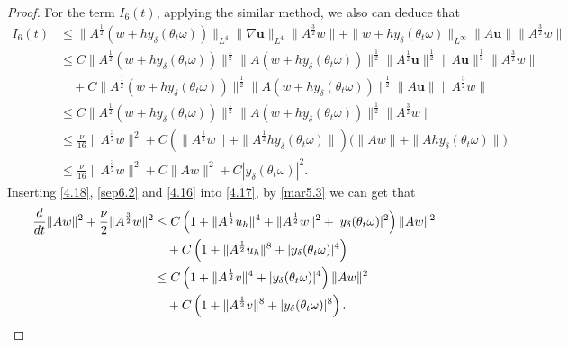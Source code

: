 \documentclass[10pt,a4paper]{amsart}
\renewcommand{\d}{{\rm{d}}}
\begin{document}
\begin{proof}
For the term $I_{6}(t)$, applying the similar method, we also can deduce that
\begin{align}\label{4.16}
I_{6}(t)&\leq\|A^{\frac12}(w+hy_\delta(\theta_t\omega))\|_{L^4}\|\nabla \textbf{u}\|_{L^4}\|A^\frac32w\|+\|w+hy_\delta(\theta_t\omega)\|_{L^\infty}\|A\textbf{u}\|\|A^\frac32w\|\nonumber\\
&\leq C\|A^{\frac12}(w+hy_\delta(\theta_t\omega))\|^\frac12\|A(w+hy_\delta(\theta_t\omega))\|^\frac12\|A^\frac12\textbf{u}\|^\frac12
\|A\textbf{u}\|^\frac12\|A^\frac32w\|\nonumber\\
& \quad +C\|A^\frac12(w+hy_\delta(\theta_t\omega))\|^\frac12\|A(w+hy_\delta(\theta_t\omega))\|^\frac12\|A\textbf{u}\|\|A^\frac32w\|\nonumber\\
&\leq C\|A^{\frac12}(w+hy_\delta(\theta_t\omega))\|^\frac12\|A(w+hy_\delta(\theta_t\omega))\|^\frac12\|A^\frac32w\|\nonumber\\
&\leq \frac \nu {16}\|A^\frac32w\|^2+C\left(\|A^{\frac12}w\|+\|A^{\frac12}hy_\delta(\theta_t\omega)\| \right) \big (\|Aw\|
+\|Ahy_\delta(\theta_t\omega)\| \big )\nonumber\\
&\leq \frac \nu {16}\|A^\frac32w\|^2+C\|Aw\|^2 +C |y_\delta(\theta_t\omega)|^2.
\end{align}
Inserting \eqref{4.18}, \eqref{sep6.2} and \eqref{4.16} into \eqref{4.17}, by \eqref{mar5.3}  we can get that
\begin{align}
 \frac{\d}{\d t}\|Aw\|^2+  \frac{\nu}{2}  \|A^{\frac32}w\|^2
&\leq C\left (1+\|A^\frac12\textbf{u}_h\|^4+\|A^\frac12w\|^2+|y_\delta(\theta_t\omega)|^2 \right )
\|Aw\|^2\nonumber\\
&\quad +C \left (1+\|A^\frac12\textbf{u}_h\|^8+|y_\delta(\theta_t\omega)|^4 \right) \nonumber \\
 &\leq C\left (1+\|A^\frac12 \textbf{v}\|^4 +|y_\delta(\theta_t\omega)|^4 \right )
\|Aw\|^2  \nonumber \\
&\quad +C \left (1+\|A^\frac12 \textbf{v}\|^8 +|y_\delta(\theta_t\omega)|^8 \right) .  \label{sep6.3}
\end{align}


\end{proof}
\end{document}

